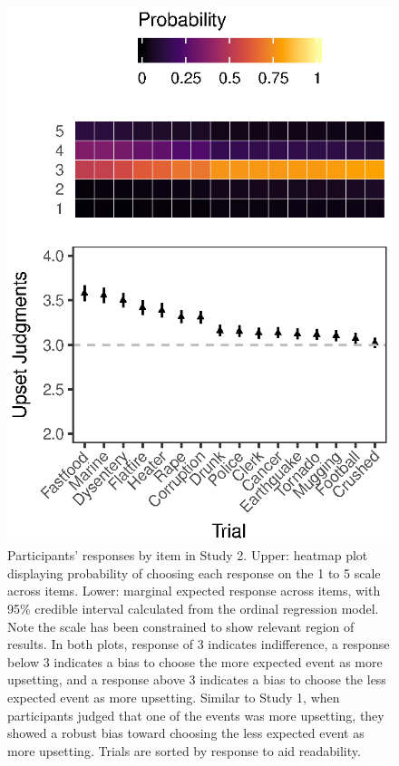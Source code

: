 \documentclass[9pt,twocolumn,twoside,lineno]{pnas-new}
\begin{document}
\begin{figure}
\centering
\includegraphics{fig2.eps}
\caption{Participants' responses by item in Study 2. Upper: heatmap plot
displaying probability of choosing each response on the 1 to 5 scale
across items. Lower: marginal expected response across items, with 95\%
credible interval calculated from the ordinal regression model. Note the
scale has been constrained to show relevant region of results. In both
plots, response of 3 indicates indifference, a response below 3
indicates a bias to choose the more expected event as more upsetting,
and a response above 3 indicates a bias to choose the less expected
event as more upsetting. Similar to Study 1, when participants judged
that one of the events was more upsetting, they showed a robust bias
toward choosing the less expected event as more upsetting. Trials are
sorted by response to aid readability. {}}
\end{figure}
\end{document}

